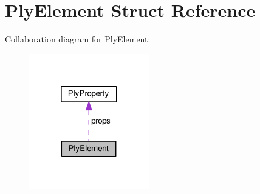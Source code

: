 \hypertarget{structPlyElement}{\section{Ply\-Element Struct Reference}
\label{structPlyElement}
}


Collaboration diagram for Ply\-Element\-:\nopagebreak
\begin{figure}[H]
\begin{center}
\leavevmode
\includegraphics[width=148pt]{structPlyElement__coll__graph}
\end{center}
\end{figure}
